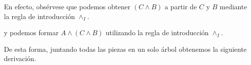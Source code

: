 \documentclass{article}
\begin{document}
\begin{example}
    En efecto, obsérvese que podemos obtener $(C \land B)$ a partir de $C$ y $B$ mediante la regla de introducción $\land_I$.

        \begin{prooftree}
        \end{prooftree}
    
    y podemos formar $A \land (C \land B)$ utilizando la regla de introducción $\land_I$.

        \begin{prooftree}
        \end{prooftree}
    
    De esta forma, juntando todas las piezas en un solo árbol obtenemos la siguiente derivación.

        \begin{prooftree}
        \end{prooftree}
\end{example}
\end{document}
